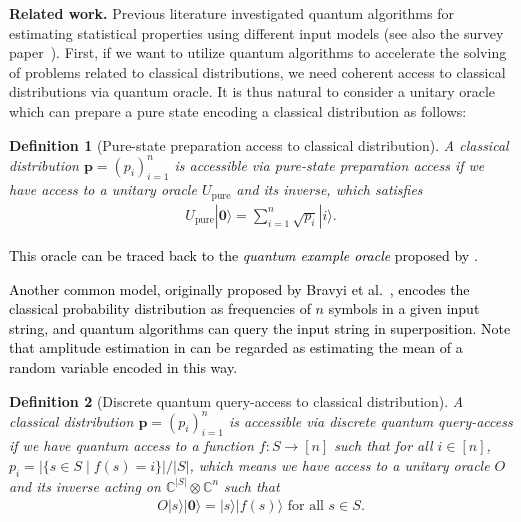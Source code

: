 \documentclass[journal]{IEEEtran}
\newtheorem{definition}{Definition}
\begin{document}
\vspace{3mm}
\noindent
\textbf{Related work.}
Previous literature investigated quantum algorithms for estimating statistical properties using different input models (see also the survey paper~\cite{montanaro2016survey}). First, if we want to utilize quantum algorithms to accelerate the solving of problems related to classical distributions, we need coherent access to classical distributions via quantum oracle. It is thus natural to consider a unitary oracle which can prepare a pure state encoding a classical distribution as follows:

\begin{definition}[Pure-state preparation access to classical distribution]\label{defn:pure-state-preparation}
    A classical distribution $\mathbf{p} = (p_i)_{i=1}^{n}$ is accessible via pure-state preparation access if we have access to a unitary oracle $U_{\mathrm{pure}}$ and its inverse, which satisfies
    \begin{align}\label{eq:pure-state-preparation}
        U_{\mathrm{pure}}|\mathbf{0}\rangle = \sum_{i=1}^n \sqrt{p_i} |i\rangle.
    \end{align}
\end{definition}

\textcolor{black}{This oracle can be traced back to the \textit{quantum example oracle} proposed by \cite{bshouty1995learning}.}

\textcolor{black}{Another common model, originally proposed by Bravyi et al.~\cite{bravyi2011quantum}, encodes the classical probability distribution as frequencies of $n$ symbols in a given input string, and quantum algorithms can query the input string in superposition. Note that amplitude estimation in \cite{brassard2002quantum} can be regarded as estimating the mean of a random variable encoded in this way.}


\begin{definition}[Discrete quantum query-access to classical distribution]\label{defn:discrete-quantum-query}
    A classical distribution $\mathbf{p} = (p_i)_{i=1}^{n}$ is accessible via discrete quantum query-access if we have quantum access to a function $f\colon S\to [n]$ such that for all $i\in[n]$, $p_i = |\{s \in S\mid f(s) = i\}|/|S|$, which means we have access to a unitary oracle $O$ and its inverse acting on $\mathbb{C}^{|S|}\otimes \mathbb{C}^{n}$ such that
    \begin{align}\label{eq:discrete-quantum-query}
        O|s\rangle|\mathbf{0}\rangle = |s\rangle|f(s)\rangle \text{ for all } s\in S.
    \end{align}
\end{definition}
\end{document}
